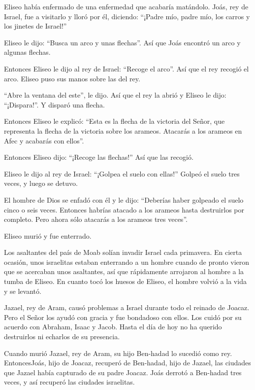  Eliseo había enfermado de una enfermedad que acabaría
matándolo. Joás, rey de Israel, fue a visitarlo y lloró por él,
diciendo: ``¡Padre mío, padre mío, los carros y los jinetes de Israel!''

 Eliseo le dijo: ``Busca un arco y unas flechas''. Así que
Joás encontró un arco y algunas flechas.

 Entonces Eliseo le dijo al rey de Israel: ``Recoge el
arco''. Así que el rey recogió el arco. Eliseo puso sus manos sobre las
del rey.

 ``Abre la ventana del este'', le dijo. Así que el rey la
abrió y Eliseo le dijo: ``¡Dispara!''. Y disparó una flecha.

Entonces Eliseo le explicó: ``Esta es la flecha de la victoria del
Señor, que representa la flecha de la victoria sobre los arameos.
Atacarás a los arameos en Afec y acabarás con ellos''.

 Entonces Eliseo dijo: ``¡Recoge las flechas!'' Así que las
recogió.

Eliseo le dijo al rey de Israel: ``¡Golpea el suelo con ellas!'' Golpeó
el suelo tres veces, y luego se detuvo.

 El hombre de Dios se enfadó con él y le dijo: ``Deberías
haber golpeado el suelo cinco o seis veces. Entonces habrías atacado a
los arameos hasta destruirlos por completo. Pero ahora sólo atacarás a
los arameos tres veces''.

 Eliseo murió y fue enterrado.

Los asaltantes del país de Moab solían invadir Israel cada primavera.
 En cierta ocasión, unos israelitas estaban enterrando a un
hombre cuando de pronto vieron que se acercaban unos asaltantes, así que
rápidamente arrojaron al hombre a la tumba de Eliseo. En cuanto tocó los
huesos de Eliseo, el hombre volvió a la vida y se levantó.

 Jazael, rey de Aram, causó problemas a Israel durante todo
el reinado de Joacaz.  Pero el Señor los ayudó con gracia y
fue bondadoso con ellos. Los cuidó por su acuerdo con Abraham, Isaac y
Jacob. Hasta el día de hoy no ha querido destruirlos ni echarlos de su
presencia.

 Cuando murió Jazael, rey de Aram, su hijo Ben-hadad lo
sucedió como rey.  EntoncesJoás, hijo de Joacaz, recuperó
de Ben-hadad, hijo de Jazael, las ciudades que Jazael había capturado de
su padre Joacaz. Joás derrotó a Ben-hadad tres veces, y así recuperó las
ciudades israelitas.

